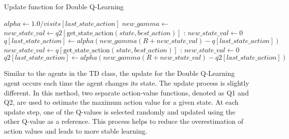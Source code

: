\begin{algorithm}
\caption{Update function for Double Q-Learning}\label{dqlUpdate}
\begin{algorithmic}
\State $ alpha \gets 1.0 / visits[last\_state\_action]$
\State $ new\_gamma \gets $
\State $new\_state\_val \gets q2[\text{get\_state\_action}(state,best\_action)]$
:
\State $new\_state\_val \gets0$
\EndIf
\State $ q[last\_state\_action] \gets alpha(new\_gamma(R + new\_state\_val) - q[last\_state\_action])$
\Else
\State $new\_state\_val \gets q[\text{get\_state\_action}(state,best\_action)]$
:
\State $new\_state\_val \gets0$
\EndIf
\State $ q2[last\_state\_action] \gets alpha(new\_gamma(R + new\_state\_val) - q2[last\_state\_action])$
\EndIf
\end{algorithmic}
\end{algorithm}

Similar to the agents in the TD class, the update for the Double Q-Learning agent occurs each time the agent changes its state. The update process is slightly different. In this method, two separate action-value functions, denoted as Q1 and Q2, are used to estimate the maximum action value for a given state. At each update step, one of the Q-values is selected randomly and updated using the other Q-value as a reference. This process helps to reduce the overestimation of action values and leads to more stable learning.